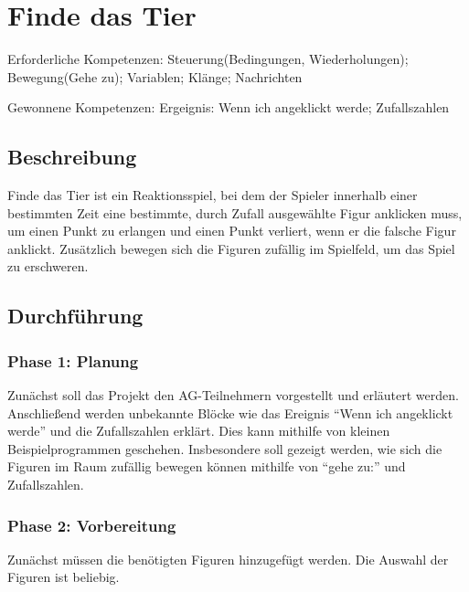 \section{Finde das Tier}\label{finde-das-tier}

Erforderliche Kompetenzen: Steuerung(Bedingungen, Wiederholungen);
Bewegung(Gehe zu); Variablen; Klänge; Nachrichten

Gewonnene Kompetenzen: Ergeignis: Wenn ich angeklickt werde;
Zufallszahlen

\begin{figure}[ht]
    \centering 
    \caption[\Sectionname]{\Sectionname}
\end{figure}

\subsection{Beschreibung}\label{beschreibung}

Finde das Tier ist ein Reaktionsspiel, bei dem der Spieler innerhalb
einer bestimmten Zeit eine bestimmte, durch Zufall ausgewählte Figur
anklicken muss, um einen Punkt zu erlangen und einen Punkt verliert,
wenn er die falsche Figur anklickt. Zusätzlich bewegen sich die Figuren
zufällig im Spielfeld, um das Spiel zu erschweren.

\subsection{Durchführung}\label{durchfuxfchrung}

\subsubsection{Phase 1: Planung}\label{phase-1-planung}

Zunächst soll das Projekt den AG-Teilnehmern vorgestellt und erläutert
werden. Anschließend werden unbekannte Blöcke wie das Ereignis ``Wenn
ich angeklickt werde'' und die Zufallszahlen erklärt. Dies kann mithilfe
von kleinen Beispielprogrammen geschehen. Insbesondere soll gezeigt
werden, wie sich die Figuren im Raum zufällig bewegen können mithilfe
von ``gehe zu:'' und Zufallszahlen.

\subsubsection{Phase 2: Vorbereitung}\label{phase-2-vorbereitung}

Zunächst müssen die benötigten Figuren hinzugefügt werden. Die Auswahl
der Figuren ist beliebig.

